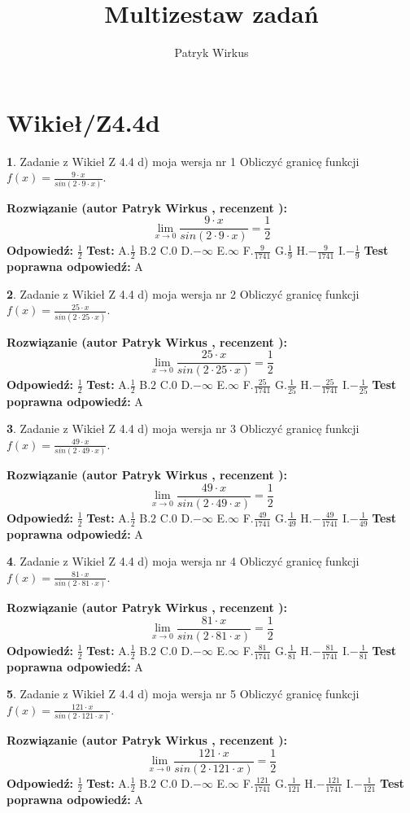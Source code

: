 \documentclass[12pt, a4paper]{article}
\title{Multizestaw zadań}
\author{Patryk Wirkus}
\date{}
\theoremstyle{definition} %
\newtheorem{zad}{}
\newcommand{\kategoria}[1]{\section{#1}}
\newcommand{\zadStart}[1]{\begin{zad}#1\newline}
\newcommand{\zadStop}{\end{zad}}
\newcommand{\rozwStart}[2]{\noindent \textbf{Rozwiązanie (autor #1 , recenzent #2): }\newline}
\newcommand{\rozwStop}{\newline}
\newcommand{\odpStart}{\noindent \textbf{Odpowiedź:}\newline}
\newcommand{\odpStop}{\newline}
\newcommand{\testStart}{\noindent \textbf{Test:}\newline}
\newcommand{\testStop}{\newline}
\newcommand{\kluczStart}{\noindent \textbf{Test poprawna odpowiedź:}\newline}
\newcommand{\kluczStop}{\newline}
\begin{document}
\maketitle

\kategoria{Wikieł/Z4.4d}


\zadStart{Zadanie z Wikieł Z 4.4 d) moja wersja nr 1}
Obliczyć granicę funkcji $f(x)=\frac{9\cdot x}{sin(2 \cdot9\cdot x)}$.
\zadStop
\rozwStart{Patryk Wirkus}{}
$$\lim\limits_{x\to 0}\frac{9\cdot x}{sin(2 \cdot9\cdot x)}=\frac{1}{2}$$
\rozwStop
\odpStart
$\frac{1}{2}$
\odpStop
\testStart
A.$\frac{1}{2}$
B.$2$
C.$0$
D.$-\infty$
E.$\infty$
F.$\frac{9}{1741}$
G.$\frac{1}{9}$
H.$-\frac{9}{1741}$
I.$-\frac{1}{9}$
\testStop
\kluczStart
A
\kluczStop



\zadStart{Zadanie z Wikieł Z 4.4 d) moja wersja nr 2}
Obliczyć granicę funkcji $f(x)=\frac{25\cdot x}{sin(2 \cdot25\cdot x)}$.
\zadStop
\rozwStart{Patryk Wirkus}{}
$$\lim\limits_{x\to 0}\frac{25\cdot x}{sin(2 \cdot25\cdot x)}=\frac{1}{2}$$
\rozwStop
\odpStart
$\frac{1}{2}$
\odpStop
\testStart
A.$\frac{1}{2}$
B.$2$
C.$0$
D.$-\infty$
E.$\infty$
F.$\frac{25}{1741}$
G.$\frac{1}{25}$
H.$-\frac{25}{1741}$
I.$-\frac{1}{25}$
\testStop
\kluczStart
A
\kluczStop



\zadStart{Zadanie z Wikieł Z 4.4 d) moja wersja nr 3}
Obliczyć granicę funkcji $f(x)=\frac{49\cdot x}{sin(2 \cdot49\cdot x)}$.
\zadStop
\rozwStart{Patryk Wirkus}{}
$$\lim\limits_{x\to 0}\frac{49\cdot x}{sin(2 \cdot49\cdot x)}=\frac{1}{2}$$
\rozwStop
\odpStart
$\frac{1}{2}$
\odpStop
\testStart
A.$\frac{1}{2}$
B.$2$
C.$0$
D.$-\infty$
E.$\infty$
F.$\frac{49}{1741}$
G.$\frac{1}{49}$
H.$-\frac{49}{1741}$
I.$-\frac{1}{49}$
\testStop
\kluczStart
A
\kluczStop



\zadStart{Zadanie z Wikieł Z 4.4 d) moja wersja nr 4}
Obliczyć granicę funkcji $f(x)=\frac{81\cdot x}{sin(2 \cdot81\cdot x)}$.
\zadStop
\rozwStart{Patryk Wirkus}{}
$$\lim\limits_{x\to 0}\frac{81\cdot x}{sin(2 \cdot81\cdot x)}=\frac{1}{2}$$
\rozwStop
\odpStart
$\frac{1}{2}$
\odpStop
\testStart
A.$\frac{1}{2}$
B.$2$
C.$0$
D.$-\infty$
E.$\infty$
F.$\frac{81}{1741}$
G.$\frac{1}{81}$
H.$-\frac{81}{1741}$
I.$-\frac{1}{81}$
\testStop
\kluczStart
A
\kluczStop



\zadStart{Zadanie z Wikieł Z 4.4 d) moja wersja nr 5}
Obliczyć granicę funkcji $f(x)=\frac{121\cdot x}{sin(2 \cdot121\cdot x)}$.
\zadStop
\rozwStart{Patryk Wirkus}{}
$$\lim\limits_{x\to 0}\frac{121\cdot x}{sin(2 \cdot121\cdot x)}=\frac{1}{2}$$
\rozwStop
\odpStart
$\frac{1}{2}$
\odpStop
\testStart
A.$\frac{1}{2}$
B.$2$
C.$0$
D.$-\infty$
E.$\infty$
F.$\frac{121}{1741}$
G.$\frac{1}{121}$
H.$-\frac{121}{1741}$
I.$-\frac{1}{121}$
\testStop
\kluczStart
A
\kluczStop
\end{document}
